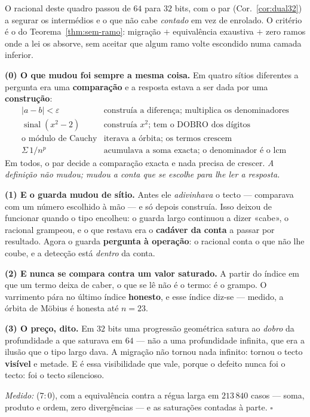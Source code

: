 \documentclass[livro.tex]{subfiles}
\begin{document}
\begin{corolario}\label{cor:migracao}
O racional deste quadro passou de $64$ para $32$ bits, com o par
(Cor.~\ref{cor:dual32}) a segurar os intermédios e o que não cabe
\emph{contado} em vez de enrolado. O critério é o do
Teorema~\ref{thm:sem-ramo}: migração $+$ equivalência exaustiva $+$ zero
ramos onde a lei os absorve, sem aceitar que algum ramo volte escondido
numa camada inferior.

\textbf{(0) O que mudou foi sempre a mesma coisa.} Em quatro sítios
diferentes a pergunta era uma \textbf{comparação} e a resposta estava a
ser dada por uma \textbf{construção}:
\[
\boxed{
\begin{array}{ll}
|a-b|<\varepsilon & \text{construía a diferença; multiplica os denominadores}\\
\operatorname{sinal}(x^{2}-2) & \text{construía } x^{2}\text{; tem o DOBRO dos dígitos}\\
\text{o módulo de Cauchy} & \text{iterava a órbita; os termos crescem}\\
\Sigma\,1/n^{p} & \text{acumulava a soma exacta; o denominador é o lcm}
\end{array}}
\]
Em todos, o par decide a comparação exacta e nada precisa de crescer.
\emph{A definição não mudou; mudou a conta que se escolhe para lhe ler a
resposta.}

\textbf{(1) E o guarda mudou de sítio.} Antes ele \emph{adivinhava} o
tecto --- comparava com um número escolhido à mão --- e só depois
construía. Isso deixou de funcionar quando o tipo encolheu: o guarda
largo continuou a dizer «cabe», o racional grampeou, e o que restava era
o \textbf{cadáver da conta} a passar por resultado. Agora o guarda
\textbf{pergunta à operação}: o racional conta o que não lhe coube, e a
detecção está \emph{dentro} da conta.

\textbf{(2) E nunca se compara contra um valor saturado.} A partir do
índice em que um termo deixa de caber, o que se lê não é o termo: é o
grampo. O varrimento pára no último índice \textbf{honesto}, e esse
índice diz-se --- medido, a órbita de Möbius é honesta até $n=23$.

\textbf{(3) O preço, dito.} Em $32$ bits uma progressão geométrica satura
ao \emph{dobro} da profundidade a que saturava em $64$ --- não a uma
profundidade infinita, que era a ilusão que o tipo largo dava. A migração
não tornou nada infinito: tornou o tecto \textbf{visível} e metade. E é
essa visibilidade que vale, porque o defeito nunca foi o tecto: foi o
tecto silencioso.

\emph{Medido:}  ($7{:}0$), com a equivalência
contra a régua larga em $213\,840$ casos --- soma, produto e ordem, zero
divergências --- e as saturações contadas à parte. $\square$
\end{corolario}
\end{document}
